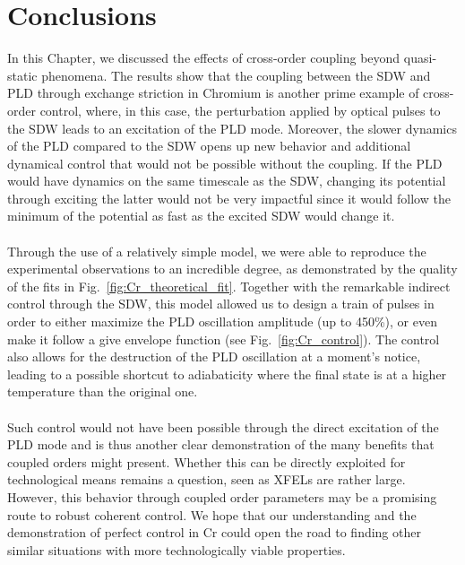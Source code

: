 \section{Conclusions}
In this Chapter, we discussed the effects of cross-order coupling beyond quasi-static phenomena.
The results show that the coupling between the SDW and PLD through exchange striction in Chromium is another prime example of cross-order control, where, in this case, the perturbation applied by optical pulses to the SDW leads to an excitation of the PLD mode.
Moreover, the slower dynamics of the PLD compared to the SDW opens up new behavior and additional dynamical control that would not be possible without the coupling.
If the PLD would have dynamics on the same timescale as the SDW, changing its potential through exciting the latter would not be very impactful since it would follow the minimum of the potential as fast as the excited SDW would change it.
\\\\
Through the use of a relatively simple model, we were able to reproduce the experimental observations to an incredible degree, as demonstrated by the quality of the fits in Fig.~\ref{fig:Cr_theoretical_fit}.
Together with the remarkable indirect control through the SDW, this model allowed us to design a train of pulses in order to either maximize the PLD oscillation amplitude (up to 450\%), or even make it follow a give envelope function (see Fig.~\ref{fig:Cr_control}).
The control also allows for the destruction of the PLD oscillation at a moment's notice, leading to a possible shortcut to adiabaticity where the final state is at a higher temperature than the original one.
\\\\
Such control would not have been possible through the direct excitation of the PLD mode and is thus another clear demonstration of the many benefits that coupled orders might present.
Whether this can be directly exploited for technological means remains a question, seen as XFELs are rather large.
However, this behavior through coupled order parameters may be a promising route to robust coherent control.
We hope that our understanding and the demonstration of perfect control in Cr could open the road to finding other similar situations with more technologically viable properties.   
